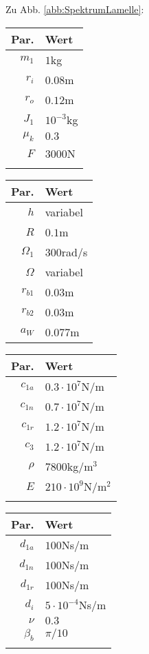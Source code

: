 Zu Abb. \ref{abb:SpektrumLamelle}: 
\begin{center}
	\begin{tabular}{r|l}
		Par.&Wert\\\hline
		$m_1$&$1$kg\\
		$r_i$&$0.08$m\\
		$r_o$&$0.12$m\\
		$J_1$&$10^{-3}$kg\\
		$\mu_k$& $0.3$\\
		$F$&$3000$N\\
		&
	\end{tabular}\hfill
	\begin{tabular}{r|l}
		Par.&Wert\\\hline
		$h$&variabel\\
		$R$&$0.1$m\\
		$\Omega_1$&$300$rad/s\\
		$\Omega$& variabel \\
		$r_{b1}$&$0.03$m\\
		$r_{b2}$&$0.03$m\\
		$a_{W}$&$0.077$m\\
	\end{tabular}\hfill
	\begin{tabular}{r|l}
		Par.&Wert\\\hline
		$c_{1a}$&$0.3\cdot10^{7}$N/m\\
		$c_{1n}$&$0.7\cdot10^{7}$N/m\\
		$c_{1r}$&$1.2\cdot10^{7}$N/m\\
		$c_{3}$&$1.2\cdot10^{7}$N/m\\
		$\rho$&$7800$kg/m$^3$\\
		$E$&$210\cdot10^9$N/m$^2$\\
		&
	\end{tabular}\hfill
	\begin{tabular}{r|l}
		Par.&Wert\\\hline
		$d_{1a}$&$100$Ns/m\\
		$d_{1n}$&$100$Ns/m\\
		$d_{1r}$&$100$Ns/m\\
		$d_i$ &$5\cdot10^{-4}$Ns/m\\
		$\nu$&$0.3$\\
		$\beta_b$&$\pi/10$\\
		&
	\end{tabular}
\end{center}

